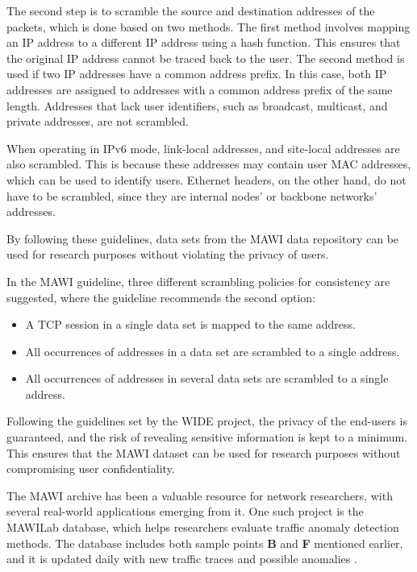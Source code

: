 \documentclass[sigconf,authorversion,nonacm]{acmart}
\begin{document}
The second step is to scramble the source and destination addresses of the packets, which is done based on two methods. The first method involves mapping an IP address to a different IP address using a hash function. This ensures that the original IP address cannot be traced back to the user. The second method is used if two IP addresses have a common address prefix. In this case, both IP addresses are assigned to addresses with a common address prefix of the same length. Addresses that lack user identifiers, such as broadcast, multicast, and private addresses, are not scrambled.

When operating in IPv6 mode, link-local addresses, and site-local addresses are also scrambled. This is because these addresses may contain user MAC addresses, which can be used to identify users. Ethernet headers, on the other hand, do not have to be scrambled, since they are internal nodes' or backbone networks' addresses. 

By following these guidelines, data sets from the MAWI data repository can be used for research purposes without violating the privacy of users.

In the MAWI guideline, three different scrambling policies for consistency are suggested, where the guideline recommends the second option:
\begin{itemize}
    \item A TCP session in a single data set is mapped to the same address. 
    \item All occurrences of addresses in a data set are scrambled to a single address.
    \item All occurrences of addresses in several data sets are scrambled to a single address.
\end{itemize}

Following the guidelines set by the WIDE project, the privacy of the end-users is guaranteed, and the risk of revealing sensitive information is kept to a minimum. This ensures that the MAWI dataset can be used for research purposes without compromising user confidentiality.

The MAWI archive has been a valuable resource for network researchers, with several real-world applications emerging from it. One such project is the MAWILab database, which helps researchers evaluate traffic anomaly detection methods. The database includes both sample points \textbf{B} and \textbf{F} mentioned earlier, and it is updated daily with new traffic traces and possible anomalies  \cite{mawilab}. 
\end{document}
